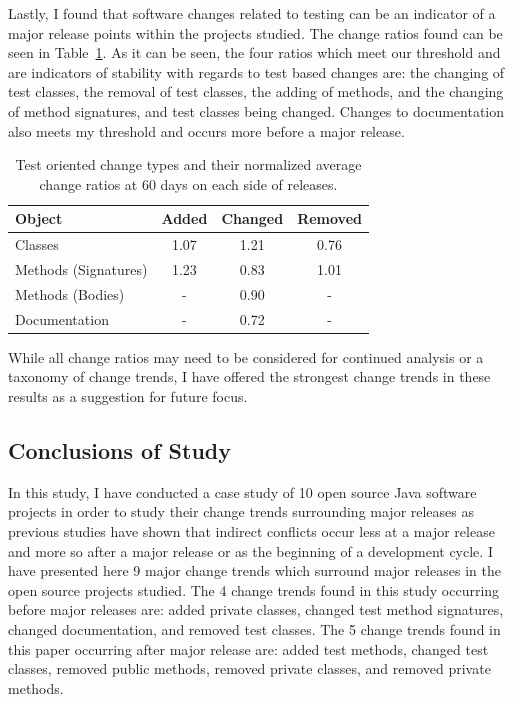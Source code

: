 Lastly, I found that software changes related to testing can be an indicator of a major release points within the projects studied. The change
ratios found can be seen in Table~\ref{tab:test}. As it can be seen, the four ratios which meet our threshold and are indicators of stability with regards to test based
changes are: the changing of test classes, the removal of test classes, the adding of methods, and the changing of method signatures, and test classes being changed.
Changes to documentation also meets my threshold and occurs more before a major release.

\begin{table}[ht]
\begin{center}
\begin{tabular}{| l | c | c | c |}
\hline
Object & Added & Changed & Removed\\
\hline
Classes & 1.07 & 1.21 & 0.76 \\
Methods (Signatures) & 1.23 & 0.83 & 1.01 \\
Methods (Bodies) & - & 0.90 & - \\
Documentation & - & 0.72 & - \\
\hline
\end{tabular}
\end{center}
\caption{Test oriented change types and their normalized average change ratios at 60 days on each side of releases. \label{tab:test}}
\end{table}

While all change ratios may need to be considered for continued analysis or a taxonomy of change trends, I have offered the strongest
change trends in these results as a suggestion for future focus.

\subsection{Conclusions of Study}

In this study, I have conducted a case study of 10 open source Java software projects in order to study their change trends surrounding
major releases as previous studies have shown that indirect conflicts occur less at a major release and more so after a major release
or as the beginning of a development cycle. I have presented here 9 major change trends which surround major releases in the open source
projects studied. The 4 change trends found in this study occurring before major releases are: added private classes, 
changed test method signatures, changed documentation, and removed test classes.
The 5 change trends found in this paper occurring after major release are: added test methods, changed test classes, removed public methods, removed
private classes, and removed private methods.


